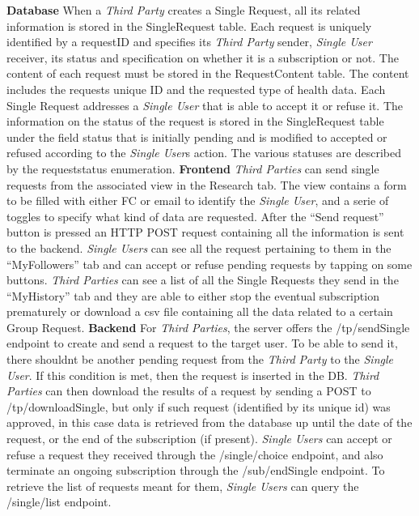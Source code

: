 \documentclass[titlepage]{article}
\begin{document}
	
	{\bf Database} \newline
	When a {\it Third Party} creates a Single Request, all its related information is stored in the SingleRequest table. Each request is uniquely identified by a requestID and specifies its {\it Third Party} sender, {\it Single User} receiver, its status and specification on whether it is a subscription or not. The content of each request must be stored in the RequestContent table. The content includes the request\textsc{}s unique ID and the requested type of health data.
	Each Single Request addresses a {\it Single User} that is able to accept it or refuse it. The information on the status of the request is stored in the SingleRequest table under the field status that is initially pending and is modified to accepted or refused according to the {\it Single User}\textsc{}s action. The various statuses are described by the requeststatus enumeration.
	\newline
	\newline
	\noindent
	{\bf Frontend} \newline
	{\it Third Parties} can send single requests from the associated view in the Research tab. The view contains a form to be filled with either FC or email to identify the {\it Single User}, and a serie of toggles to specify what kind of data are requested. After the “Send request” button is pressed an HTTP POST request containing all the information is sent to the backend.
	{\it Single Users} can see all the request pertaining to them in the “MyFollowers” tab and can accept or refuse pending requests by tapping on some buttons. {\it Third Parties} can see a list of all the Single Requests they send in the “MyHistory” tab and they are able to either stop the eventual subscription prematurely or download a csv file containing all the data related to a certain Group Request. 
	\newline
	\newline
	\noindent
	{\bf Backend} \newline
	For {\it Third Parties}, the server offers the /tp/sendSingle endpoint to create and send a request to the target user. To be able to send it, there shouldn\textsc{}t be another pending request from the {\it Third Party} to the {\it Single User}. If this condition is met, then the request is inserted in the DB. {\it Third Parties} can then download the results of a request by sending a POST to /tp/downloadSingle, but only if such request (identified by its unique id) was approved, in this case data is retrieved from the database up until the date of the request, or the end of the subscription (if present).
	{\it Single Users} can accept or refuse a request they received through the /single/choice endpoint, and also terminate an ongoing subscription through the /sub/endSingle endpoint. To retrieve the list of requests meant for them, {\it Single Users} can query the /single/list endpoint.
	
\end{document}
